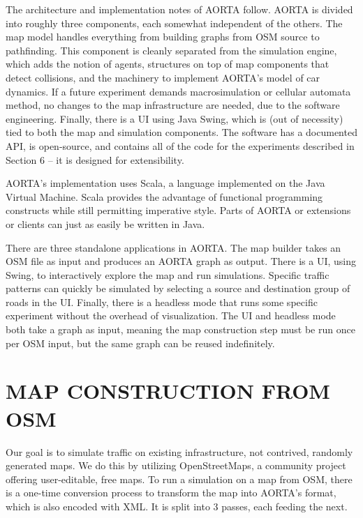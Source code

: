 \documentclass[letterpaper, 10 pt, conference]{ieeeconf}  %
\begin{document}

The architecture and implementation notes of AORTA follow. AORTA is divided into
roughly three components, each somewhat independent of the others. The map model
handles everything from building graphs from OSM source to pathfinding. This
component is cleanly separated from the simulation engine, which adds the notion
of agents, structures on top of map components that detect collisions, and the
machinery to implement AORTA's model of car dynamics. If a future experiment
demands macrosimulation or cellular automata method, no changes to the map
infrastructure are needed, due to the software engineering. Finally, there is a
UI using Java Swing, which is (out of necessity) tied to both the map and
simulation components. The software has a documented API, is open-source, and
contains all of the code for the experiments described in Section 6 -- it is
designed for extensibility.

AORTA's implementation uses Scala, a language implemented on the Java Virtual
Machine. Scala provides the advantage of functional programming constructs while
still permitting imperative style. Parts of AORTA or extensions or clients can
just as easily be written in Java.

There are three standalone applications in AORTA. The map builder takes an OSM
file as input and produces an AORTA graph as output. There is a UI, using Swing,
to interactively explore the map and run simulations. Specific traffic patterns
can quickly be simulated by selecting a source and destination group of roads in
the UI. Finally, there is a headless mode that runs some specific experiment
without the overhead of visualization. The UI and headless mode both take a
graph as input, meaning the map construction step must be run once per OSM
input, but the same graph can be reused indefinitely.


\section{MAP CONSTRUCTION FROM OSM}

Our goal is to simulate traffic on existing infrastructure, not contrived,
randomly generated maps. We do this by utilizing OpenStreetMaps, a community
project offering user-editable, free maps.  To run a simulation on a map from
OSM, there is a one-time conversion process to transform the map into AORTA's
format, which is also encoded with XML. It is split into 3 passes, each feeding
the next.
\end{document}
